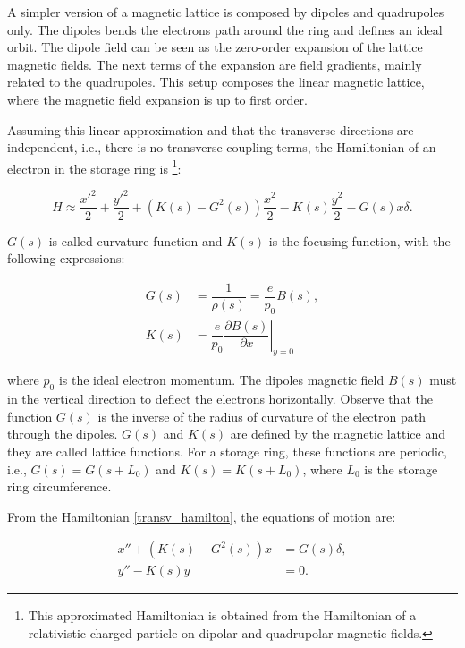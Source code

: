 A simpler version of a magnetic lattice is composed by dipoles and quadrupoles only. The dipoles bends the electrons path around the ring and defines an ideal orbit. The dipole field can be seen as the zero-order expansion of the lattice magnetic fields. The next terms of the expansion are field gradients, mainly related to the quadrupoles. This setup composes the linear magnetic lattice, where the magnetic field expansion is up to first order.

Assuming this linear approximation and that the transverse directions are independent, i.e., there is no transverse coupling terms, the Hamiltonian of an electron in the storage ring is \footnote{This approximated Hamiltonian is obtained from the Hamiltonian of a relativistic charged particle on dipolar and quadrupolar magnetic fields.}:

\begin{equation}
    H \approx \dfrac{{x'}^2}{2} + \dfrac{{y'}^2}{2} + \left(K(s)- G^{2}(s)\right)\dfrac{{x}^2}{2} - K(s) \frac{y^2}{2} - G(s) x \delta.
    \label{transv_hamilton}
\end{equation}

$G(s)$ is called curvature function and $K(s)$ is the focusing function, with the following expressions:

\begin{align}
    G(s) &= \dfrac{1}{\rho(s)} = \dfrac{e}{p_0}B(s), \\
    K(s) &= \dfrac{e}{p_0}\left.\dfrac{\partial B(s)}{\partial x}\right|_{y=0}
\end{align}

where $p_0$ is the ideal electron momentum. The dipoles magnetic field $B(s)$ must in the vertical direction to deflect the electrons horizontally. Observe that the function $G(s)$ is the inverse of the radius of curvature of the electron path through the dipoles. $G(s)$ and $K(s)$ are defined by the magnetic lattice and they are called lattice functions. For a storage ring, these functions are periodic, i.e., $G(s) = G(s+L_0)$ and $K(s) = K(s+L_0)$, where $L_0$ is the storage ring circumference.


From the Hamiltonian \eqref{transv_hamilton}, the equations of motion are:

\begin{align}
    x'' + \left(K(s) - G^{2}(s)\right)x &= G(s) \delta, \\
    y'' - K(s)y &= 0.
\end{align}

